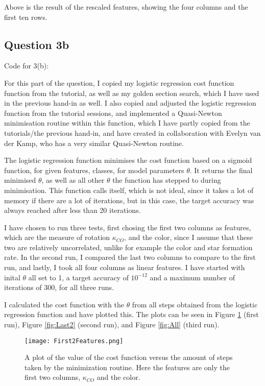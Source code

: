 

Above is the result of the rescaled features, showing the four columns and the first ten rows.

\subsection{Question 3b}

Code for 3(b):


For this part of the question, I copied my logistic regression cost function function from the tutorial, as well as my golden section search, which I have used in the previous hand-in as well. 
I also copied and adjusted the logistic regression function from the tutorial sessions, and implemented a Quasi-Newton minimisation routine within this function, which I have partly copied from the tutorials/the previous hand-in, and have created in collaboration with Evelyn van der Kamp, who has a very similar Quasi-Newton routine.

The logistic regression function minimises the cost function based on a sigmoid function, for given features, classes, for model parameters \textbf{$\theta$}.
It returns the final minimised \textbf{$\theta$}, as well as all other \textbf{$\theta$} the function has stepped to during minimisation.
This function calls itself, which is not ideal, since it takes a lot of memory if there are a lot of iterations, but in this case, the target accuracy was always reached after less than 20 iterations.

I have chosen to run three tests, first chosing the first two columns as features, which are the measure of rotation $\kappa_{CO}$, and the color, since I assume that these two are relatively uncorrelated, unlike for example the color and star formation rate.
In the second run, I compared the last two columns to compare to the first run, and lastly, I took all four columns as linear features.
I have started with inital \textbf{$\theta$} all set to 1, a target accuracy of $10^{-12}$ and a maximum number of iterations of 300, for all three runs.

I calculated the cost function with the \textbf{$\theta$} from all steps obtained from the logistic regression function and have plotted this.
The plots can be seen in Figure \ref{fig:First2} (first run), Figure \ref{fig:Last2} (second run), and Figure \ref{fig:All} (third run).

\begin{figure}[ht!]
  \centering
  \texttt{[image: First2Features.png]}
  \caption{A plot of the value of the cost function versus the amount of steps taken by the minimization routine. Here the features are only the first two columns, $\kappa_{CO}$ and the color.}
  \label{fig:First2}
\end{figure}

